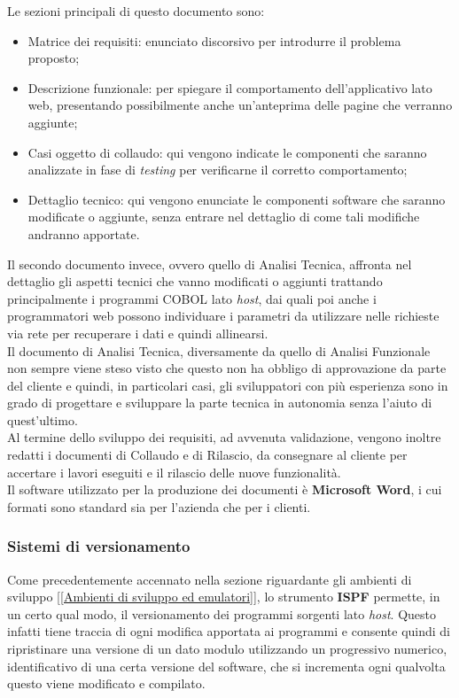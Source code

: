 	Le sezioni principali di questo documento sono:
\begin{itemize}
	\item Matrice dei requisiti: enunciato discorsivo per introdurre il problema proposto;
	\item Descrizione funzionale: per spiegare il comportamento dell'applicativo lato web, presentando possibilmente anche un'anteprima delle pagine che verranno aggiunte;
	\item Casi oggetto di collaudo: qui vengono indicate le componenti che saranno analizzate in fase di  \textit{testing} per verificarne il corretto comportamento;
	\item Dettaglio tecnico: qui vengono enunciate le componenti software che saranno modificate o aggiunte, senza entrare nel dettaglio di come tali modifiche andranno apportate.
\end{itemize}

	Il secondo documento invece, ovvero quello di Analisi Tecnica, affronta nel dettaglio gli aspetti tecnici che vanno modificati o aggiunti trattando principalmente i programmi COBOL lato \textit{host}, dai quali poi anche i programmatori web possono individuare i parametri da utilizzare nelle richieste via rete per recuperare i dati e quindi allinearsi.\\
	
	Il documento di Analisi Tecnica, diversamente da quello di Analisi Funzionale non sempre viene steso visto che questo non ha obbligo di approvazione da parte del cliente e quindi, in particolari casi, gli sviluppatori con più esperienza sono in grado di progettare e sviluppare la parte tecnica in autonomia senza l'aiuto di quest'ultimo.\\
	
	Al termine dello sviluppo dei requisiti, ad avvenuta validazione, vengono inoltre redatti i documenti di Collaudo e di Rilascio, da consegnare al cliente per accertare i lavori eseguiti e il rilascio delle nuove funzionalità.\\
			
	Il software utilizzato per la produzione dei documenti è \textbf{Microsoft Word}, i cui formati sono standard sia per l'azienda che per i clienti.
	
	
	\subsubsection{Sistemi di versionamento}

	Come precedentemente accennato nella sezione riguardante gli ambienti di sviluppo [\ref{Ambienti di sviluppo ed emulatori}], lo strumento \textbf{ISPF} permette, in un certo qual modo, il versionamento dei programmi sorgenti lato \textit{host}. Questo infatti tiene traccia di ogni modifica apportata ai programmi e consente quindi di ripristinare una versione di un dato modulo utilizzando un progressivo numerico, identificativo di una certa versione del software, che si incrementa ogni qualvolta questo viene modificato e compilato.\\
	
